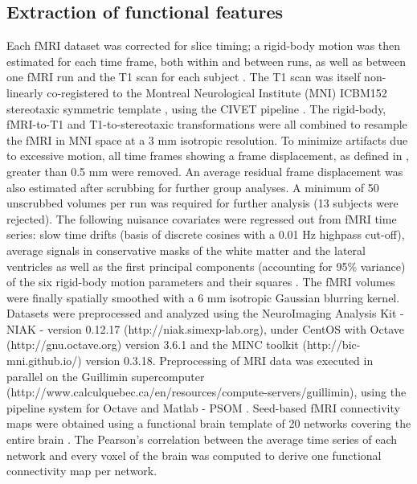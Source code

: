 \documentclass[authoryear]{elsarticle}
\begin{document}
\subsection*{Extraction of functional features}
Each fMRI dataset was corrected for slice timing; a rigid-body motion was then estimated for each time frame, both within and between runs, as well as between one fMRI run and the T1 scan for each subject \citep{Collins1994}. The T1 scan was itself non-linearly co-registered to the Montreal Neurological Institute (MNI) ICBM152 stereotaxic symmetric template \citep{Fonov2011}, using the CIVET pipeline \citep{Ad-Dab'bagh2006}. The rigid-body, fMRI-to-T1 and T1-to-stereotaxic transformations were all combined to resample the fMRI in MNI space at a 3 mm isotropic resolution. To minimize artifacts due to excessive motion, all time frames showing a frame displacement, as defined in \cite{Power2012}, greater than 0.5 mm were removed. An average residual frame displacement was also estimated after scrubbing for further group analyses. A minimum of 50 unscrubbed volumes per run was required for further analysis (13 subjects were rejected). The following nuisance covariates were regressed out from fMRI time series: slow time drifts (basis of discrete cosines with a 0.01 Hz highpass cut-off), average signals in conservative masks of the white matter and the lateral ventricles as well as the first principal components (accounting for 95\% variance) of the six rigid-body motion parameters and their squares \citep{Giove2009,Lund2006}. The fMRI volumes were finally spatially smoothed with a 6 mm isotropic Gaussian blurring kernel. Datasets were preprocessed and analyzed using the NeuroImaging Analysis Kit - NIAK - version 0.12.17 (http://niak.simexp-lab.org), under CentOS with Octave (http://gnu.octave.org) version 3.6.1 and the MINC toolkit (http://bic-mni.github.io/) version 0.3.18. Preprocessing of MRI data was executed in parallel on the Guillimin supercomputer (http://www.calculquebec.ca/en/resources/compute-servers/guillimin), using the pipeline system for Octave and Matlab - PSOM \citep{Bellec2012}. Seed-based fMRI connectivity maps were obtained using a functional brain template of 20 networks covering the entire brain \citep{Urchs2017}. The Pearson's correlation between the average time series of each network and every voxel of the brain was computed to derive one functional connectivity map per network.
\end{document}
